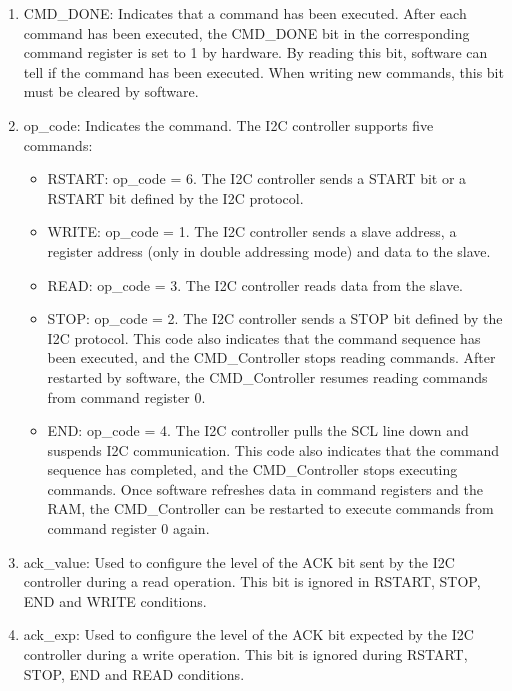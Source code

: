 \documentclass[main\_\_EN.tex]{subfiles}
\begin{document}
\begin{enumerate}

\item CMD\_DONE: Indicates that a command has been executed. After each command has been executed, the CMD\_DONE bit in the corresponding command register is set to 1 by hardware. By reading this bit, software can tell if the command has been executed. When writing new commands, this bit must be cleared by software.

\item op\_code: Indicates the command. The I2C controller supports five commands:

\begin{itemize}
    \item RSTART: op\_code = 6. The I2C controller sends a START bit or a RSTART bit defined by the I2C protocol.
    
    \item WRITE: op\_code = 1. The I2C controller sends a slave address, a register address  (only in double addressing mode) and data to the slave.
    
    \item READ: op\_code = 3. The I2C controller reads data from the slave.

    \item STOP: op\_code = 2. The I2C controller sends a STOP bit defined by the I2C protocol. This code also indicates that the command sequence has been executed, and the CMD\_Controller stops reading commands. After restarted by software, the CMD\_Controller resumes reading commands from command register 0.
    
    \item END: op\_code = 4. The I2C controller pulls the SCL line down and suspends I2C communication. This code also indicates that the command sequence has completed, and the CMD\_Controller stops executing commands. Once software refreshes data in command registers and the RAM, the CMD\_Controller can be restarted to execute commands from command register 0 again. 
\end{itemize}

\item ack\_value: Used to configure the level of the ACK bit sent by the I2C controller during a read operation. This bit is ignored in RSTART, STOP, END and WRITE conditions.

\item ack\_exp: Used to configure the level of the ACK bit expected by the I2C controller during a write operation. This bit is ignored during RSTART, STOP, END and READ conditions.


\end{enumerate}
\end{document}
